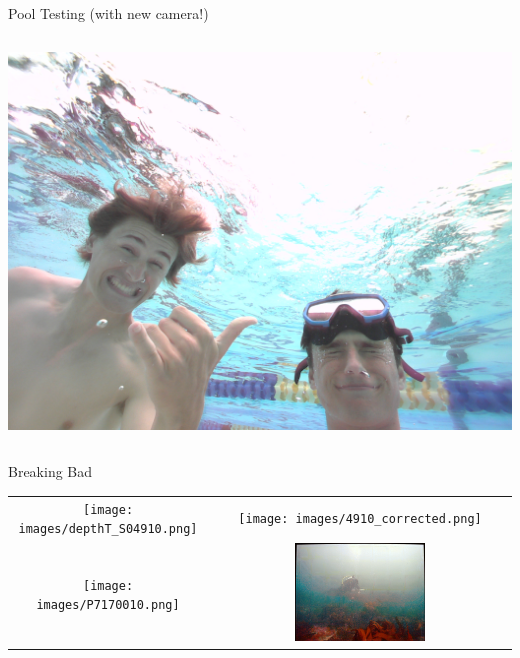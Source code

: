 \begin{frame}{Pool Testing (with new camera!)}
\begin{columns}[c]
        \centering
        \includegraphics[width=\linewidth]{images/frame_02357.png}
    \end{columns}
\end{frame}

\begin{frame}{Breaking Bad}
    \centering
    \begin{tabular}{cc}
        \texttt{[image: images/depthT\_S04910.png]} &
        \texttt{[image: images/4910\_corrected.png]} \\
        \texttt{[image: images/P7170010.png]} &
        \includegraphics[width=0.45\textwidth]{images/P7170010_corrected.JPG} \\
    \end{tabular}
\end{frame}

